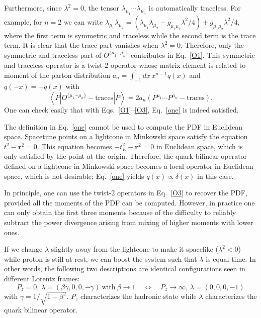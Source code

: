 Furthermore, since $\lambda^2=0$, the tensor $\lambda_{\mu_1}\cdots
\lambda_{\mu_n}$ is automatically traceless. For example, for $n=2$ we can write
$\lambda_{\mu_1}\lambda_{\mu_2}=\left( \lambda_{\mu_1}\lambda_{\mu_2}-g_{\mu_1\mu_2}\lambda^2/4\right) +g_{\mu_1\mu_2}\lambda^2/4$, where the first term is symmetric and traceless while the second
term is the trace term. It is clear that the trace part vanishes when $\lambda^2=0$.
Therefore, only the symmetric and traceless part of $O^{\{\mu_1\cdots \mu_n\}}$ contributes in Eq.~\ref{O1}. This symmetric and traceless operator
is a twist-2 operator whose matrix element is related to moment of the parton
distribution $a_n = \int_{-1}^1 dx\,x^{n-1} q(x)$ and $q(-x) = -\bar{q}(x)$ with
%
\begin{equation}
\left\langle P \left\vert O^{\{\mu_1\cdots \mu_n\}}-\text{traces}%
\right\vert P\right\rangle =2a_n\left( P^{\mu_1}\cdots P^{\mu_n}-%
\text{traces}\right) .  \label{O3}
\end{equation}
%
One can check easily that with Eqs.~\ref{O1}--\ref{O3}, Eq.~\ref{one} is
indeed satisfied.

The definition in Eq.~\ref{one} cannot be used to compute the PDF in
Euclidean space. Spacetime points on a lightcone in Minkowski space
satisfy the equation $t^2-\mathbf{r}^2=0$. This equation becomes
$-t_E^2-\mathbf{r}^2=0$ in Euclidean space, which is only satisfied by
the point at the origin. Therefore, the quark bilinear operator
defined on a lightcone in Minkowski space becomes a local operator in
Euclidean space, which is not desirable; Eq.~\ref{one} yields
$q(x) \propto \delta(x)$ in this case.

In principle, one can use the twist-2 operators in Eq.~\ref{O3} to recover
the PDF, provided all the moments of the PDF can be computed. However,
in practice one can only obtain the first three moments because of the
difficulty to reliably subtract the power divergence arising from
mixing of higher moments with lower ones.

If we change $\lambda$ slightly away from the lightcone to make
it spacelike ($\lambda^2<0$) while proton is still at rest, we can boost the system such that $\lambda$ is equal-time.
In other words, the following two descriptions are
identical configurations seen in different Lorentz frames: 
%
\begin{equation}
P_z=0,\,\lambda=(\beta\gamma,0,0,-\gamma) \ \text{with}\  \beta\to 1 \quad \Leftrightarrow \quad
P_z\rightarrow \infty,\,\lambda = (0,0,0,-1)
\end{equation}
%
with $\gamma = 1/\sqrt{1-\beta^2}$.  
$P_z$ characterizes the hadronic state while $\lambda$ characterizes the quark bilinear operator.

